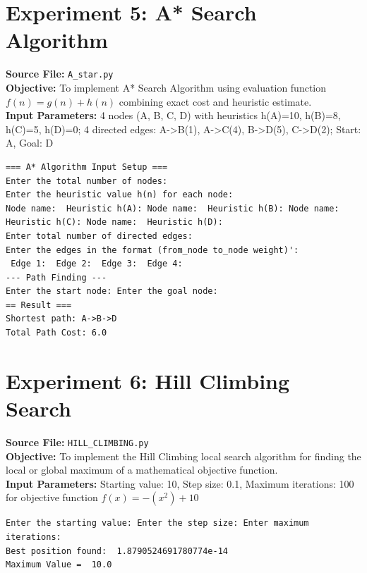 \documentclass[11pt,a4paper]{article}
\begin{document}
\section{Experiment 5: A* Search Algorithm}
\textbf{Source File:} \texttt{A_star.py} \\[4pt]
\textbf{Objective:} To implement A* Search Algorithm using evaluation function $f(n) = g(n) + h(n)$ combining exact cost and heuristic estimate. \\[4pt]
\textbf{Input Parameters:} 4 nodes (A, B, C, D) with heuristics h(A)=10, h(B)=8, h(C)=5, h(D)=0; 4 directed edges: A->B(1), A->C(4), B->D(5), C->D(2); Start: A, Goal: D \\[6pt]
\begin{tcolorbox}[colback=gray!5!white,colframe=blue!70!black,title={\textbf{Program Output: A* Search Algorithm}}]
\begin{verbatim}
=== A* Algorithm Input Setup ===
Enter the total number of nodes: 
Enter the heuristic value h(n) for each node:
Node name:  Heuristic h(A): Node name:  Heuristic h(B): Node name:  Heuristic h(C): Node name:  Heuristic h(D): 
Enter total number of directed edges:
Enter the edges in the format (from_node to_node weight)':
 Edge 1:  Edge 2:  Edge 3:  Edge 4: 
--- Path Finding ---
Enter the start node: Enter the goal node: 
== Result ===
Shortest path: A->B->D
Total Path Cost: 6.0
\end{verbatim}
\end{tcolorbox}
\vspace{1em}

\section{Experiment 6: Hill Climbing Search}
\textbf{Source File:} \texttt{HILL_CLIMBING.py} \\[4pt]
\textbf{Objective:} To implement the Hill Climbing local search algorithm for finding the local or global maximum of a mathematical objective function. \\[4pt]
\textbf{Input Parameters:} Starting value: 10, Step size: 0.1, Maximum iterations: 100 for objective function $f(x) = -(x^2) + 10$ \\[6pt]
\begin{tcolorbox}[colback=gray!5!white,colframe=blue!70!black,title={\textbf{Program Output: Hill Climbing Search}}]
\begin{verbatim}
Enter the starting value: Enter the step size: Enter maximum iterations: 
Best position found:  1.8790524691780774e-14
Maximum Value =  10.0
\end{verbatim}
\end{tcolorbox}
\vspace{1em}
\end{document}
